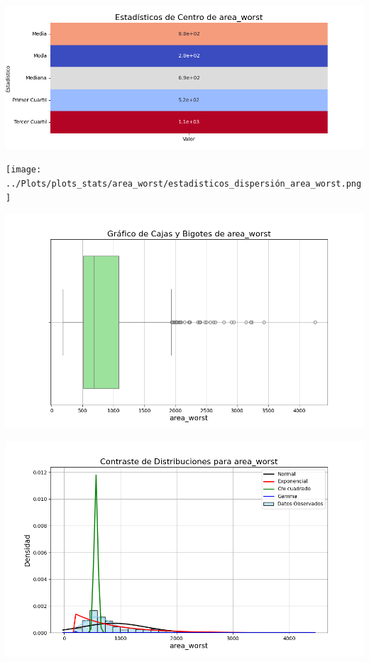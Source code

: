 \documentclass[a4paper, 12pt]{article}
\begin{document}
\includegraphics[width=\textwidth]{../Plots/plots_stats/area_worst/estadisticas_centro_area_worst.png}




\texttt{[image: ../Plots/plots\_stats/area\_worst/estadisticos\_dispersión\_area\_worst.png]}



\includegraphics[width=\textwidth]{../Plots/plots_stats/area_worst/boxplot_area_worst.png}




\includegraphics[width=\textwidth]{../Plots/plots_stats/area_worst/distribuciones_conocidas_area_worst.png}
\end{document}
